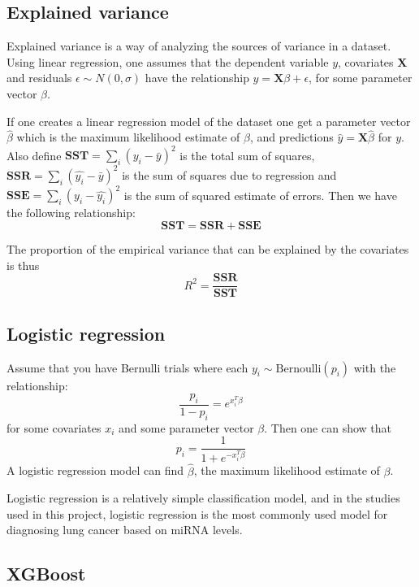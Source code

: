 \subsection{Explained variance}
\label{subsec:explained_variance}

Explained variance is a way of analyzing the sources of variance in a dataset. Using linear regression, one assumes that the dependent variable $y$, covariates $\mathbf{X}$ and residuals $\epsilon \sim N(0, \sigma)$ have the relationship $y = \mathbf{X}\beta + \epsilon$, for some parameter vector $\beta$.


If one creates a linear regression model of the dataset one get a parameter vector $\hat{\beta}$ which is the maximum likelihood estimate of $\beta$, and predictions $\hat{y} = \mathbf{X} \hat{\beta}$ for $y$. Also define $\mathbf{SST} = \sum_i \left(y_i - \bar{y}\right)^2$ is the total sum of squares, $\mathbf{SSR} = \sum_i \left(\hat{y_i} - \bar{y}\right)^2$ is the sum of squares due to regression and $\mathbf{SSE} = \sum_i \left(y_i - \hat{y_i}\right)^2$ is the sum of squared estimate of errors. Then we have the following relationship:
$$\mathbf{SST} = \mathbf{SSR} + \mathbf{SSE}$$

The proportion of the empirical variance that can be explained by the covariates is thus
$$R^2 = \frac{\mathbf{SSR}}{\mathbf{SST}}$$

\subsection{Logistic regression}

Assume that you have Bernulli trials where each $y_i \sim \text{Bernoulli}(p_i)$ with the relationship:
$$\frac{p_i}{1-p_i} = e^{x_i^T\beta}$$
for some covariates $x_i$ and some parameter vector $\beta$.
Then one can show that
$$p_i = \frac{1}{1 + e^{-x_i^T\beta}}$$
A logistic regression model can find $\hat{\beta}$, the maximum likelihood estimate of $\beta$.

Logistic regression is a relatively simple classification model, and in the studies used in this project, logistic regression is the most commonly used model for diagnosing lung cancer based on miRNA levels.


\subsection{XGBoost}

